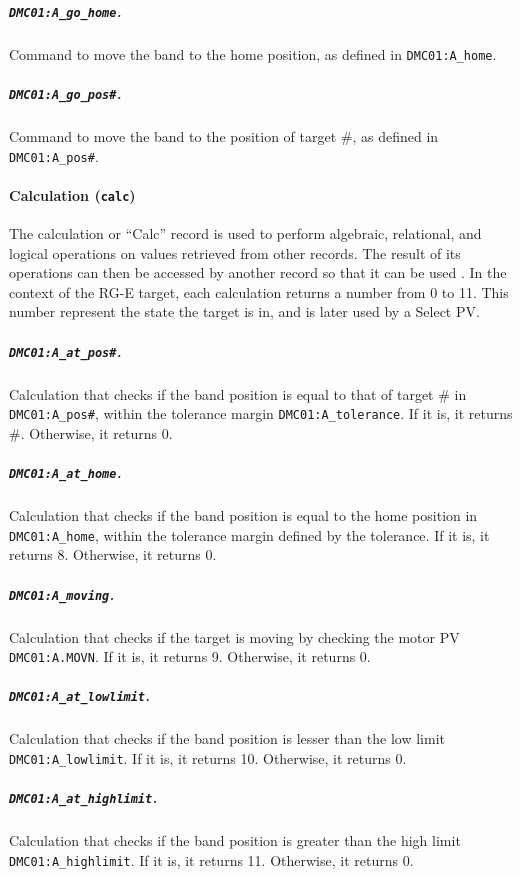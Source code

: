     \subparagraph{\texttt{DMC01:A\_go\_home}.}
        Command to move the band to the home position, as defined in \texttt{DMC01:A\_home}.

    \subparagraph{\texttt{DMC01:A\_go\_pos\#}.}
        Command to move the band to the position of target \#, as defined in \texttt{DMC01:A\_pos\#}.

\paragraph{Calculation (\texttt{calc})}
    The calculation or ``Calc'' record is used to perform algebraic, relational, and logical operations on values retrieved from other records.
    The result of its operations can then be accessed by another record so that it can be used \cite{stanley1998}.
    In the context of the RG-E target, each calculation returns a number from 0 to 11.
    This number represent the state the target is in, and is later used by a Select PV.

    \subparagraph{\texttt{DMC01:A\_at\_pos\#}.}
        Calculation that checks if the band position is equal to that of target \# in \texttt{DMC01:A\_pos\#}, within the tolerance margin \texttt{DMC01:A\_tolerance}.
        If it is, it returns \#.
        Otherwise, it returns 0.

    \subparagraph{\texttt{DMC01:A\_at\_home}.}
        Calculation that checks if the band position is equal to the home position in \texttt{DMC01:A\_home}, within the tolerance margin defined by the tolerance.
        If it is, it returns 8.
        Otherwise, it returns 0.

    \subparagraph{\texttt{DMC01:A\_moving}.}
        Calculation that checks if the target is moving by checking the motor PV \texttt{DMC01:A.MOVN}.
        If it is, it returns 9.
        Otherwise, it returns 0.

    \subparagraph{\texttt{DMC01:A\_at\_lowlimit}.}
        Calculation that checks if the band position is lesser than the low limit \texttt{DMC01:A\_lowlimit}.
        If it is, it returns 10.
        Otherwise, it returns 0.

    \subparagraph{\texttt{DMC01:A\_at\_highlimit}.}
        Calculation that checks if the band position is greater than the high limit \texttt{DMC01:A\_highlimit}.
        If it is, it returns 11.
        Otherwise, it returns 0.

